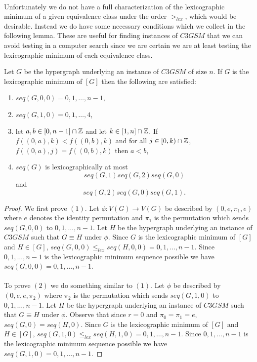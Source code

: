 \begin{definition}
\paragraph{}
Unfortunately we do not have a full characterization of the lexicographic minimum of a given equivalence class under the order $>_{lex}$, which would be desirable. Instead we do have some necessary conditions which we collect in the following lemma. These are useful for finding instances of $C3GSM$ that we can avoid testing in a computer search since we are certain we are at least testing the lexicographic minimum of each equivalence class.
\begin{lemma}\label{lemma:nec-symmetry}
Let $G$ be the hypergraph underlying an instance of $C3GSM$ of size $n$. If $G$ is the lexicographic minimum of $[G]$ then the following are satisfied:
\begin{enumerate}
\item $seq(G,0,0) = 0,1,\dots,n-1$,
\item $seq(G,1,0) = 0,1,\dots,4$,
\item let $a, b \in [0,n-1] \cap \mathbb{Z}$ and let $k \in [1,n] \cap \mathbb{Z}$. If $f((0,a), k) < f((0,b), k)$ and for all $j \in [0,k) \cap \mathbb{Z}$, $f((0,a),j) =f((0,b),k)$ then $a < b$,
\item $seq(G)$ is lexicographically at most $$seq(G,1)seq(G,2)seq(G,0)$$ and $$seq(G,2)seq(G,0)seq(G,1).$$
\end{enumerate}
\end{lemma}
\begin{proof}
We first prove $(1)$. Let $\phi : V(G) \rightarrow V(G)$ be described by $(0,e,\pi_1, e)$ where $e$ denotes the identity permutation and $\pi_1$ is the permutation which sends $seq(G,0,0)$ to $0,1,\dots,n-1$. Let $H$ be the hypergraph underlying an instance of $C3GSM$ such that $G \equiv H$ under $\phi$. Since $G$ is the lexicographic minimum of $[G]$ and $H \in [G]$, $seq(G,0,0) \leq_{lex} seq(H,0,0) = 0,1,\dots,n-1$. Since $0,1,\dots,n-1$ is the lexicographic minimum sequence possible we have $seq(G,0,0) = 0,1,\dots,n-1$.
\paragraph{}
To prove $(2)$ we do something similar to $(1)$. Let $\phi$ be described by $(0,e,e,\pi_2)$ where $\pi_2$ is the permutation which sends $seq(G,1,0)$ to $0,1,\dots,n-1$. Let $H$ be the hypergraph underlying an instance of $C3GSM$ such that $G \equiv H$ under $\phi$. Observe that since $r = 0$ and $\pi_0 = \pi_1 = e$, $seq(G,0) = seq(H,0)$. Since $G$ is the lexicographic minimum of $[G]$ and $H \in [G]$, $seq(G,1,0) \leq_{lex} seq(H,1,0) = 0,1,\dots,n-1$. Since $0,1,\dots,n-1$ is the lexicographic minimum sequence possible we have $seq(G,1,0) = 0,1,\dots,n-1$.

\end{proof}
\end{definition}

